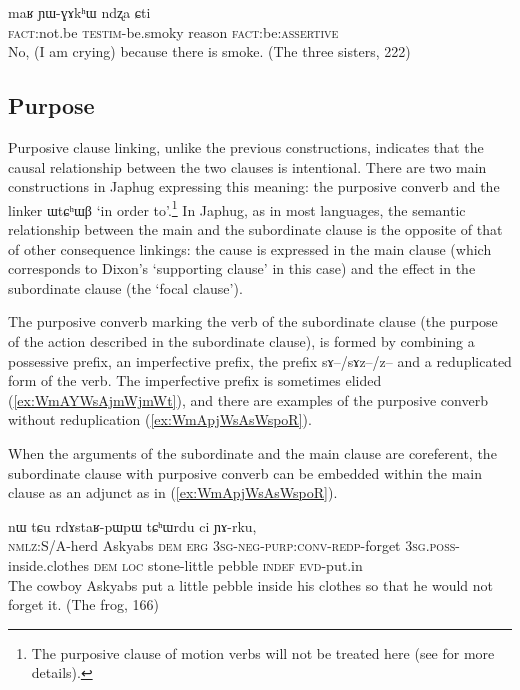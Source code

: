 \documentclass[oldfontcommands,oneside,a4paper,11pt]{article}
\newcommand{\ipa}[1]{{\phon \mbox{#1}}} %
\newcommand{\refb}[1]{(\ref{#1})}
\begin{document}
\begin{exe}
\ex \label{ex:YWGAkhW.ndzxa}
\gll
\ipa{maʁ}   	\ipa{ɲɯ-ɣɤkʰɯ}   	\ipa{ndʐa}   	\ipa{ɕti}   \\
\textsc{fact}:not.be \textsc{testim}-be.smoky reason \textsc{fact}:be:\textsc{assertive} \\
\glt No, (I am crying) because there is smoke. (The three sisters, 222) 
\end{exe} 
 

\subsection{Purpose} \label{sec:purposive}

Purposive clause linking, unlike the previous constructions, indicates that the causal relationship between the two clauses is intentional. There are two main constructions in Japhug expressing this meaning: the purposive converb and the linker \ipa{ɯtɕʰɯβ} `in order to'.\footnote{The purposive clause of motion verbs will not be treated here (see \citet{jacques13harmonization} for more details).} In Japhug, as in most languages, the semantic relationship between the main and the subordinate clause is the opposite of that of other consequence linkings: the cause is expressed in the main clause (which corresponds to Dixon's `supporting clause' in this case) and the effect in the subordinate clause (the `focal clause').

The purposive converb marking the verb of the subordinate clause (the purpose of the action described in the subordinate clause), is formed by combining a possessive prefix, an imperfective prefix, the prefix \ipa{sɤ}--/\ipa{sɤz}--/\ipa{z}-- and a reduplicated form of the verb. The imperfective prefix is sometimes elided \refb{ex:WmAYWsAjmWjmWt}, and there are examples of the purposive converb without reduplication \refb{ex:WmApjWsAsWspoR}.  

When the arguments of the subordinate and the main clause are coreferent, the subordinate clause with purposive converb can be embedded within the main clause as an adjunct as in \refb{ex:WmApjWsAsWspoR}.
 
\begin{exe}
\ex \label{ex:WmAYWsAjmWjmWt}
\gll
[\ipa{kɯ-lɤɣ}   	\ipa{acɤβ}   	\ipa{nɯ}   	\ipa{kɯ}   	\ipa{\textbf{ɯ-mɤ-sɤ-jmɯ-jmɯt}},]   	\ipa{ɯ-pʰɯŋgɯ}   	\ipa{nɯ}   	\ipa{tɕu}   	\ipa{rdɤstaʁ-pɯpɯ}   	\ipa{tɕʰɯrdu}   	\ipa{ci}  \ipa{ɲɤ-rku,}\\
 \textsc{nmlz}:S/A-herd Askyabs \textsc{dem} \textsc{erg}  \textsc{3sg-neg-purp:conv-redp}-forget \textsc{3sg.poss}-inside.clothes \textsc{dem} \textsc{loc} stone-little pebble \textsc{indef}
 \textsc{evd}-put.in\\
\glt The cowboy Askyabs put a little pebble inside his clothes so that he would not forget it. (The frog, 166)
\end{exe}
 
\end{document}
